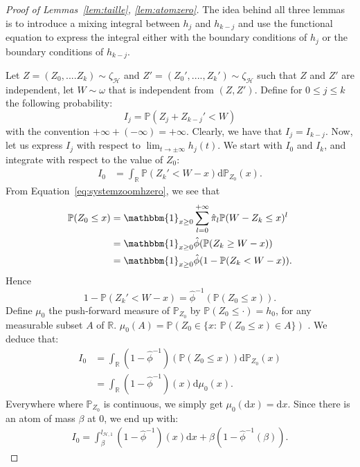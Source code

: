 \documentclass[11pt]{article}
\begin{document}
\begin{proof}[Proof of Lemmas~\ref{lem:taille}, \ref{lem:atomzero}]
    The idea behind all three lemmas is to introduce a mixing integral between $h_{j}$ and $h_{k-j}$ and use the functional equation to express the integral either with the boundary conditions of $h_{j}$ or the boundary conditions of $h_{k-j}$.

    Let $Z=(Z_0,....Z_k) \sim \zeta_{\mathcal{H}}$ and $Z'=(Z_0',....,Z_k') \sim \zeta_{\mathcal{H}}$ such that $Z$ and $Z'$ are independent, let $W \sim \omega$ that is independent from $(Z,Z')$.
    Define for $0\leq j \leq k$ the following probability:
    \begin{equation}\label{eq:integralemagique}
        I_j=\mathbb{P}(Z_j+Z_{k-j}'<W)
    \end{equation}
    with the convention $+\infty + (-\infty)=+\infty$.
    Clearly, we have that $I_j=I_{k-j}$. Now, let us express $I_j$ with respect to $\lim_{t \rightarrow \pm \infty } h_j(t) $.
   We start with $I_0$ and $I_k$, and integrate with respect to the value of $Z_0$:
    \begin{align*}
     I_0&= \int_{\mathbb{R}}\mathbb{P}(Z_{k}'<W-x)\mathrm{d}\mathbb{P}_{Z_0}(x).   
    \end{align*}
    From Equation~\eqref{eq:systemzoomhzero}, we see that 
    \begin{align*}
    \mathbb{P}(Z_0\leq x)&=\mathbbm{1}_{x \geq 0} \sum_{l=0}^{+\infty}\hat{\pi}_l \mathbb{P}(W-Z_k\leq x)^{l} \\
    &=\mathbbm{1}_{x \geq 0} \hat{\phi}(\mathbb{P}(Z_k \geq W-x)) \\
    &=\mathbbm{1}_{x \geq 0} \hat{\phi}(1-\mathbb{P}(Z_k < W-x)).
    \end{align*}
    Hence \[1-\mathbb{P}(Z_{k}'<W-x)= \hat{\phi}^{-1}(\mathbb{P}(Z_0 \leq x)).\]
    Define $\mu_0$ the push-forward measure of $\mathbb{P}_{Z_0}$ by $\mathbb{P}(Z_0 \leq  \cdot)=h_0$, for any measurable subset $A$ of $\mathbb{R}$. $\mu_0(A)=\mathbb{P}(Z_0 \in \{x: \, \mathbb{P}(Z_0 \leq  x) \in A\})$ . We deduce that:
    \begin{align*}
        I_0&=\int_{\mathbb{R}}(1-\hat{\phi}^{-1})(\mathbb{P}(Z_0\leq x))\mathrm{d}\mathbb{P}_{Z_0}(x) \\
        &= \int_{\mathbb{R}}(1-\hat{\phi}^{-1})(x)\mathrm{d}\mu_0(x).
    \end{align*}
    Everywhere where $\mathbb{P}_{Z_0}$ is continuous, we simply get $\mu_0(\mathrm{d}x)=\mathrm{d}x$. Since there is an atom of mass $\beta$ at $0$, we end up with:
    \begin{align*}
        I_0=\int_{\beta}^{l_{\mathcal{H},1}}(1-\hat{\phi}^{-1})(x)\mathrm{d}x + \beta(1-\hat{\phi}^{-1}(\beta)).
    \end{align*}


\end{proof}
\end{document}

